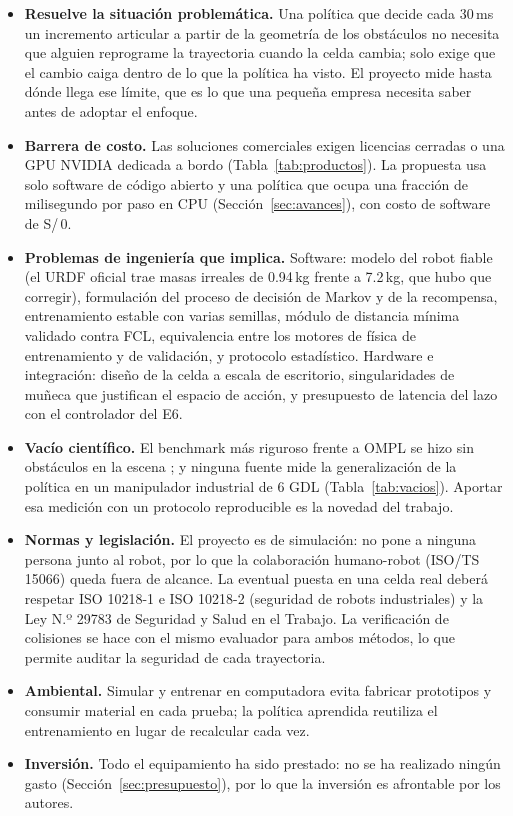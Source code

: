 \documentclass[11pt,a4paper,twoside]{article}
\begin{document}
\begin{itemize}
\item \textbf{Resuelve la situación problemática.} Una política que decide cada 30\,ms un incremento articular a partir de la geometría de los obstáculos no necesita que alguien reprograme la trayectoria cuando la celda cambia; solo exige que el cambio caiga dentro de lo que la política ha visto. El proyecto mide hasta dónde llega ese límite, que es lo que una pequeña empresa necesita saber antes de adoptar el enfoque.
\item \textbf{Barrera de costo.} Las soluciones comerciales exigen licencias cerradas o una GPU NVIDIA dedicada a bordo (Tabla~\ref{tab:productos}). La propuesta usa solo software de código abierto y una política que ocupa una fracción de milisegundo por paso en CPU (Sección~\ref{sec:avances}), con costo de software de S/\,0.
\item \textbf{Problemas de ingeniería que implica.} Software: modelo del robot fiable (el URDF oficial trae masas irreales de 0.94\,kg frente a 7.2\,kg, que hubo que corregir), formulación del proceso de decisión de Markov y de la recompensa, entrenamiento estable con varias semillas, módulo de distancia mínima validado contra FCL, equivalencia entre los motores de física de entrenamiento y de validación, y protocolo estadístico. Hardware e integración: diseño de la celda a escala de escritorio, singularidades de muñeca que justifican el espacio de acción, y presupuesto de latencia del lazo con el controlador del E6.
\item \textbf{Vacío científico.} El benchmark más riguroso frente a OMPL se hizo sin obstáculos en la escena \cite{fidalgo2025}; y ninguna fuente mide la generalización de la política en un manipulador industrial de 6 GDL (Tabla~\ref{tab:vacios}). Aportar esa medición con un protocolo reproducible es la novedad del trabajo.
\item \textbf{Normas y legislación.} El proyecto es de simulación: no pone a ninguna persona junto al robot, por lo que la colaboración humano-robot (ISO/TS 15066) queda fuera de alcance. La eventual puesta en una celda real deberá respetar ISO 10218-1 e ISO 10218-2 (seguridad de robots industriales) y la Ley N.º 29783 de Seguridad y Salud en el Trabajo. La verificación de colisiones se hace con el mismo evaluador para ambos métodos, lo que permite auditar la seguridad de cada trayectoria.
\item \textbf{Ambiental.} Simular y entrenar en computadora evita fabricar prototipos y consumir material en cada prueba; la política aprendida reutiliza el entrenamiento en lugar de recalcular cada vez.
\item \textbf{Inversión.} Todo el equipamiento ha sido prestado: no se ha realizado ningún gasto (Sección~\ref{sec:presupuesto}), por lo que la inversión es afrontable por los autores.
\end{itemize}
\end{document}
